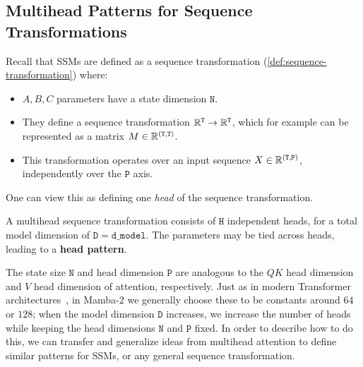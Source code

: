 \subsection{Multihead Patterns for Sequence Transformations}
\label{sec:architecture:multihead}

Recall that SSMs are defined as a sequence transformation (\cref{def:sequence-transformation})
where:
\begin{itemize}
  \item $A, B, C$ parameters have a state dimension $\mathtt{N}$.
  \item They define a sequence transformation $\mathbb{R}^\mathtt{T} \to \mathbb{R}^\mathtt{T}$, which for example can be represented as a matrix $M \in \mathbb{R}^{\mathtt{(T, T)}}$.
  \item This transformation operates over an input sequence $X \in \mathbb{R}^{\mathtt{(T, P)}}$, independently over the $\mathtt{P}$ axis.
\end{itemize}
One can view this as defining one \emph{head} of the sequence transformation.
\begin{definition}
  \label{def:head-pattern}
  A multihead sequence transformation consists of $\mathtt{H}$ independent heads, for a total model dimension of $\mathtt{D}=\mathtt{d\_model}$.
  The parameters may be tied across heads, leading to a \textbf{head pattern}.
\end{definition}
The state size $\mathtt{N}$ and head dimension $\mathtt{P}$ are analogous to the $QK$ head dimension and $V$ head dimension of attention, respectively.
Just as in modern Transformer architectures~\citep{chowdhery2022palm,touvron2023llama},
in Mamba-2 we generally choose these to be constants around $64$ or $128$; when the model dimension $\mathtt{D}$ increases, we increase the number of heads while keeping the head dimensions $\mathtt{N}$ and $\mathtt{P}$ fixed.
In order to describe how to do this,
we can transfer and generalize ideas from multihead attention to define similar patterns for SSMs, or any general sequence transformation.

